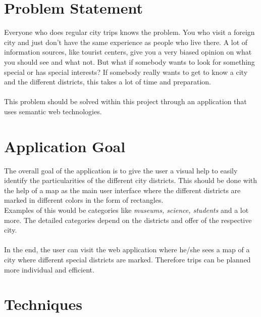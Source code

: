\section{Problem Statement}
Everyone who does regular city trips knows the problem. You who visit a foreign city and just don’t have the same experience as people who live there.  A lot of information sources, like tourist centers, give you a very biased opinion on what you should see and what not. But what if somebody wants to look for something special or has special interests? If somebody really wants to get to know a city and the different districts, this takes a lot of time and preparation.
\\ \\
This problem should be solved within this project through an application that uses semantic web technologies.

\section{Application Goal}
The overall goal of the application is to give the user a visual help to easily identify the particularities of the different city districts. This should be done with the help of a map as the main user interface where the different districts are marked in different colors in the form of rectangles.
\\
Examples of this would be categories like \textit{museums, science, students} and a lot more. The detailed categories depend on the districts and offer of the respective city. 
\\ \\
In the end, the user can visit the web application where he/she sees a map of a city where different special districts are marked. Therefore trips can be planned more individual and efficient.

\section{Techniques}\label{sec:Techniques}

